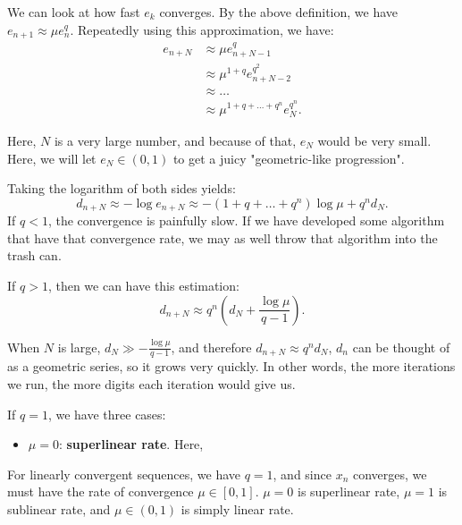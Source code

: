 We can look at how fast \( e_{k} \) converges. By the above definition, we have
\( e_{n + 1} \approx \mu e_{n}^{q} \). Repeatedly using this approximation, we
have:
\begin{align*}
  e_{n + N} &\approx \mu e_{n + N - 1}^{q} \\
            &\approx \mu^{1 + q} e_{n + N - 2}^{q^2}\\
            &\approx \ldots \\
            &\approx \mu ^{1 + q + \ldots  + q^{n}}e_{N}^{q^{n}}
.\end{align*}

Here, \( N \) is a very large number, and because of that, \( e_{N} \) would be
very small. Here, we will let \( e_{N} \in (0, 1) \) to get a juicy
"geometric-like progression". 

Taking the logarithm of both sides yields:
\[
  d_{n + N} \approx -\log e_{n + N} \approx -(1 + q + \ldots  + q^{n})\log \mu +
  q^{n}d_{N}
.\]
If \( q < 1 \), the convergence is painfully slow. If we have developed some
algorithm that have that convergence rate, we may as well throw that algorithm
into the trash can.

If \( q > 1 \), then we can have this estimation:
\[
  d_{n + N} \approx q^{n} \left( d_{N} + \frac{\log \mu}{q - 1} \right)
.\] 

When \( N \) is large, \( d_{N} \gg -\frac{\log \mu}{q - 1} \), and therefore \(
d_{n + N} \approx q^{n}d_{N}\), \( d_{n} \) can be thought of as a geometric
series, so it grows very quickly. In other words, the more iterations we run,
the more digits each iteration would give us.


If \( q = 1 \), we have three cases:
\begin{itemize}
\item \( \mu = 0 \): \textbf{superlinear rate}. Here, 
\end{itemize}

For linearly convergent sequences, we have \( q = 1 \), and since \( x_{n} \)
converges, we must have the rate of convergence \( \mu \in [0, 1] \). \( \mu = 0
\) is superlinear rate, \( \mu = 1 \) is sublinear rate, and \( \mu  \in (0, 1)
\) is simply linear rate.


